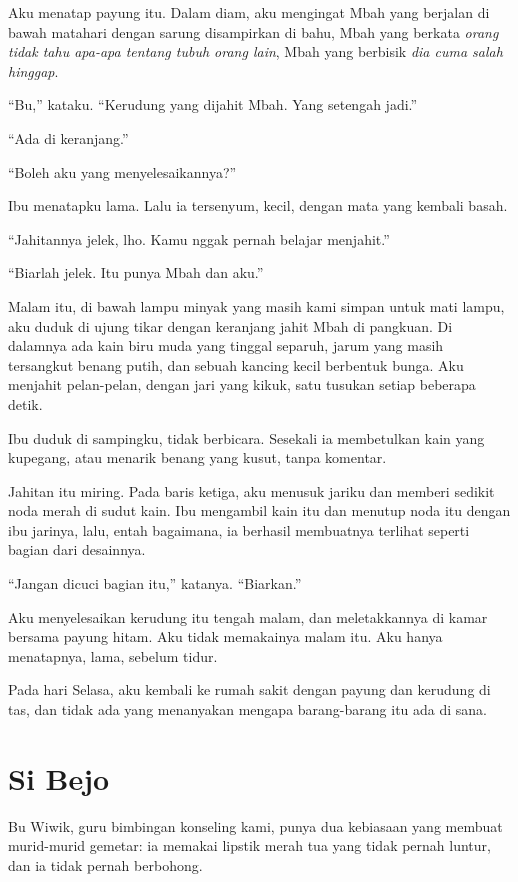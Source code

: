 \documentclass[11pt,twoside,openany]{book}
\begin{document}
Aku menatap payung itu. Dalam diam, aku mengingat Mbah yang berjalan di bawah matahari dengan sarung disampirkan di bahu, Mbah yang berkata \emph{orang tidak tahu apa-apa tentang tubuh orang lain}, Mbah yang berbisik \emph{dia cuma salah hinggap}.

``Bu,'' kataku. ``Kerudung yang dijahit Mbah. Yang setengah jadi.''

``Ada di keranjang.''

``Boleh aku yang menyelesaikannya?''

Ibu menatapku lama. Lalu ia tersenyum, kecil, dengan mata yang kembali basah.

``Jahitannya jelek, lho. Kamu nggak pernah belajar menjahit.''

``Biarlah jelek. Itu punya Mbah dan aku.''

Malam itu, di bawah lampu minyak yang masih kami simpan untuk mati lampu, aku duduk di ujung tikar dengan keranjang jahit Mbah di pangkuan. Di dalamnya ada kain biru muda yang tinggal separuh, jarum yang masih tersangkut benang putih, dan sebuah kancing kecil berbentuk bunga. Aku menjahit pelan-pelan, dengan jari yang kikuk, satu tusukan setiap beberapa detik.

Ibu duduk di sampingku, tidak berbicara. Sesekali ia membetulkan kain yang kupegang, atau menarik benang yang kusut, tanpa komentar.

Jahitan itu miring. Pada baris ketiga, aku menusuk jariku dan memberi sedikit noda merah di sudut kain. Ibu mengambil kain itu dan menutup noda itu dengan ibu jarinya, lalu, entah bagaimana, ia berhasil membuatnya terlihat seperti bagian dari desainnya.

``Jangan dicuci bagian itu,'' katanya. ``Biarkan.''

Aku menyelesaikan kerudung itu tengah malam, dan meletakkannya di kamar bersama payung hitam. Aku tidak memakainya malam itu. Aku hanya menatapnya, lama, sebelum tidur.

Pada hari Selasa, aku kembali ke rumah sakit dengan payung dan kerudung di tas, dan tidak ada yang menanyakan mengapa barang-barang itu ada di sana.

\chapter{Si Bejo}
Bu Wiwik, guru bimbingan konseling kami, punya dua kebiasaan yang membuat murid-murid gemetar: ia memakai lipstik merah tua yang tidak pernah luntur, dan ia tidak pernah berbohong.
\end{document}
